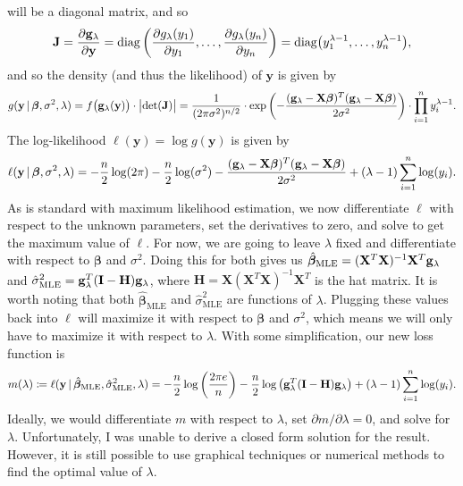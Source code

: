 \documentclass[10pt]{article}
\begin{document}
\begin{itemize}
    will be a diagonal matrix, and so 
    \begin{align*}
        \mathbf{J}
        = \frac{\partial \mathbf{g}_{\lambda}}{\partial \mathbf{y}}
        = \mathrm{diag} \left( \frac{\partial g_{\lambda}(y_1)}{\partial y_1}, \ldots, \frac{\partial g_{\lambda}(y_n)}{\partial y_n} \right)
        = \mathrm{diag} \big( y_1^{\lambda - 1}, \ldots, y_n^{\lambda - 1} \big), 
    \end{align*}
    and so the density (and thus the likelihood) of \(\mathbf{y}\) is given by 
    \begin{align*}
        g(\mathbf{y} \,|\, \bm{\beta}, \sigma^2, \lambda)
        = f \big( \mathbf{g}_{\lambda}(\mathbf{y}) \big) \cdot \big|\mathrm{det}(\mathbf{J})\big|
        = \frac{1}{(2\pi\sigma^2)^{n/2}} \cdot \mathrm{exp} \left( - \frac{(\mathbf{g}_{\lambda} - \mathbf{X}\bm{\beta})^T (\mathbf{g}_{\lambda} - \mathbf{X}\bm{\beta})}{2 \sigma^2} \right) \cdot \prod_{i=1}^n y_i^{\lambda - 1}.
    \end{align*}
    The log-likelihood \(\ell(\mathbf{y}) = \log g(\mathbf{y})\) is given by 
    \begin{align*}
        \ell(\mathbf{y} \,|\, \bm{\beta}, \sigma^2, \lambda) 
        = - \frac{n}{2} \log (2\pi) - \frac{n}{2} \log (\sigma^2) - \frac{(\mathbf{g}_{\lambda} - \mathbf{X}\bm{\beta})^T (\mathbf{g}_{\lambda} - \mathbf{X}\bm{\beta})}{2 \sigma^2} + (\lambda - 1) \sum_{i=1}^n \log (y_i).
    \end{align*}
    As is standard with maximum likelihood estimation, we now differentiate \(\ell\) with respect to the unknown parameters, set the derivatives to zero, and solve to get the maximum value of \(\ell\). 
    For now, we are going to leave \(\lambda\) fixed and differentiate with respect to \(\bm{\beta}\) and \(\sigma^2\). Doing this for both gives us 
    \(\hat{\bm{\beta}}_{\mathrm{MLE}} = (\mathbf{X}^T\mathbf{X})^{-1}\mathbf{X}^T\mathbf{g}_{\lambda}\) and \(\hat{\sigma}^2_{\mathrm{MLE}} = \mathbf{g}_{\lambda}^T (\mathbf{I} - \mathbf{H}) \mathbf{g}_{\lambda}\), where 
    \(\mathbf{H} = \mathbf{X}(\mathbf{X}^T\mathbf{X})^{-1}\mathbf{X}^T\) is the hat matrix. 
    It is worth noting that both \(\hat{\bm{\beta}}_{\mathrm{MLE}}\) and \(\hat{\sigma}^2_{\mathrm{MLE}}\) are functions of \(\lambda\). 
    Plugging these values back into \(\ell\) will maximize it with respect to \(\bm{\beta}\) and \(\sigma^2\), 
    which means we will only have to maximize it with respect to \(\lambda\). 
    With some simplification, our new loss function is 
    \begin{align*}
        m(\lambda)
        \coloneqq \ell(\mathbf{y} \,|\, \hat{\bm{\beta}}_{\mathrm{MLE}}, \hat{\sigma}^2_{\mathrm{MLE}}, \lambda)
        = - \frac{n}{2} \log \left( \frac{2 \pi e}{n} \right) - \frac{n}{2} \log \big( \mathbf{g}_{\lambda}^T(\mathbf{I} - \mathbf{H}) \mathbf{g}_{\lambda} \big) + (\lambda - 1) \sum_{i=1}^n \log(y_i).
    \end{align*}
    Ideally, we would differentiate \(m\) with respect to \(\lambda\), set \(\partial m / \partial \lambda = 0\), and solve for \(\lambda\). Unfortunately, I was unable to 
    derive a closed form solution for the result. However, it is still possible to use graphical techniques or numerical methods to find the optimal value of \(\lambda\). 


\end{itemize}
\end{document}
